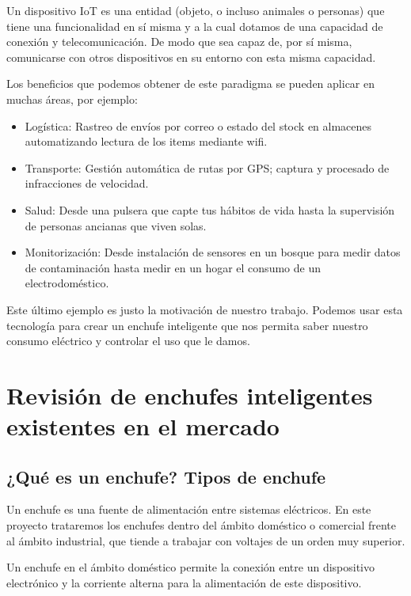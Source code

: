\documentclass[a4paper,10pt]{article}
\begin{document}
Un dispositivo IoT es una entidad (objeto, o incluso animales o
personas) que tiene una funcionalidad en sí misma y a la cual dotamos de
una capacidad de conexión y telecomunicación. De modo que sea capaz de,
por sí misma, comunicarse con otros dispositivos en su entorno con esta
misma capacidad.

Los beneficios que podemos obtener de este paradigma se pueden aplicar
en muchas áreas, por
ejemplo\cite{vongsingthongs.;smanchats.IoTExamplesSuranaree}:

\begin{itemize}
\item
  Logística: Rastreo de envíos por correo o estado del stock en
  almacenes automatizando lectura de los items mediante wifi.
\item
  Transporte: Gestión automática de rutas por GPS; captura y procesado
  de infracciones de velocidad.
\item
  Salud: Desde una pulsera que capte tus hábitos de vida hasta
  la supervisión de personas ancianas que viven solas.
\item
  Monitorización: Desde instalación de sensores en un bosque para medir
  datos de contaminación hasta medir en un hogar el consumo de un
  electrodoméstico.
\end{itemize}

Este último ejemplo es justo la motivación de nuestro trabajo. Podemos
usar esta tecnología para crear un enchufe inteligente que nos permita
saber nuestro consumo eléctrico y controlar el uso que le damos.

\newpage

\section{Revisión de enchufes inteligentes existentes en el
mercado}\label{revisiuxf3n-de-enchufes-inteligentes-existentes-en-el-mercado}

\subsection{¿Qué es un enchufe? Tipos de
enchufe}\label{quuxe9-es-un-enchufe-tipos-de-enchufe}

Un enchufe es una fuente de alimentación entre sistemas eléctricos. En
este proyecto trataremos los enchufes dentro del ámbito doméstico o
comercial frente al ámbito industrial, que tiende a trabajar con
voltajes de un orden muy superior.

Un enchufe en el ámbito doméstico permite la conexión entre un
dispositivo electrónico y la corriente alterna para la alimentación de
este dispositivo.
\end{document}
